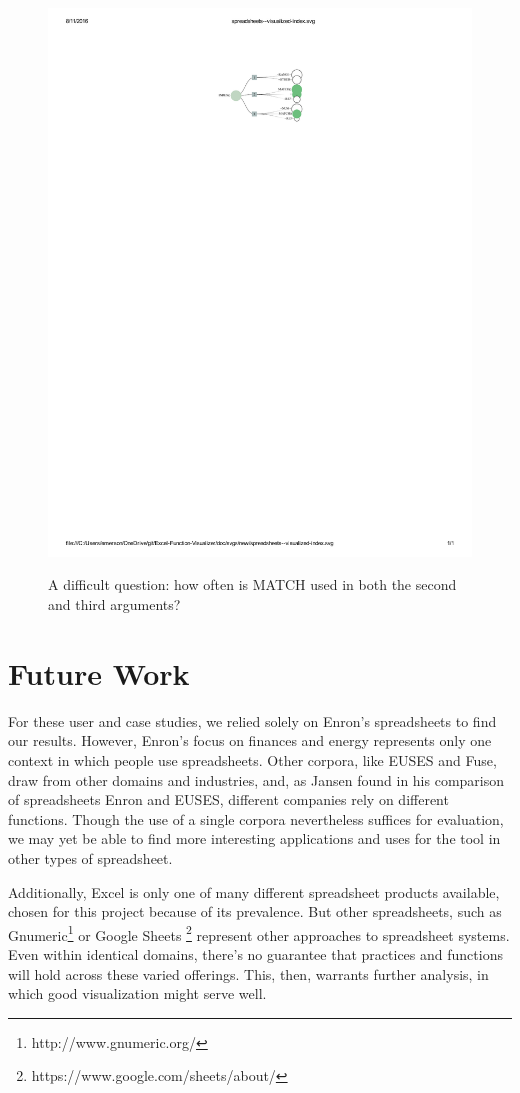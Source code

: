 \documentclass[conference]{IEEEtran}
\begin{document}
	\begin{figure} \centering \includegraphics[width=.5\textwidth]{index}
		\label{fig:index} \caption{A difficult question: how often is MATCH used in
			both the second and third arguments?} \end{figure}
	
	
	\section{Future Work} For these user and case studies, we relied solely on
	Enron's spreadsheets to find our results. However, Enron's focus on finances
	and energy represents only one context in which people use spreadsheets. Other
	corpora, like EUSES and Fuse, draw from other domains and industries, and, as
	Jansen found in his comparison of spreadsheets Enron and EUSES, different
	companies rely on different functions. Though the use of a single corpora
	nevertheless suffices for evaluation, we may yet be able to find more
	interesting applications and uses for the tool in other types of spreadsheet.
	\par
	
	Additionally, Excel is only one of many different spreadsheet products
	available, chosen for this project because of its prevalence. But other
	spreadsheets, such as Gnumeric\footnote{http://www.gnumeric.org/} or Google
	Sheets \footnote{https://www.google.com/sheets/about/} represent other
	approaches to spreadsheet systems. Even within identical domains, there's no
	guarantee that practices and functions will hold across these varied offerings.
	This, then, warrants further analysis, in which good visualization might serve
	well. \par
	
\end{document}
